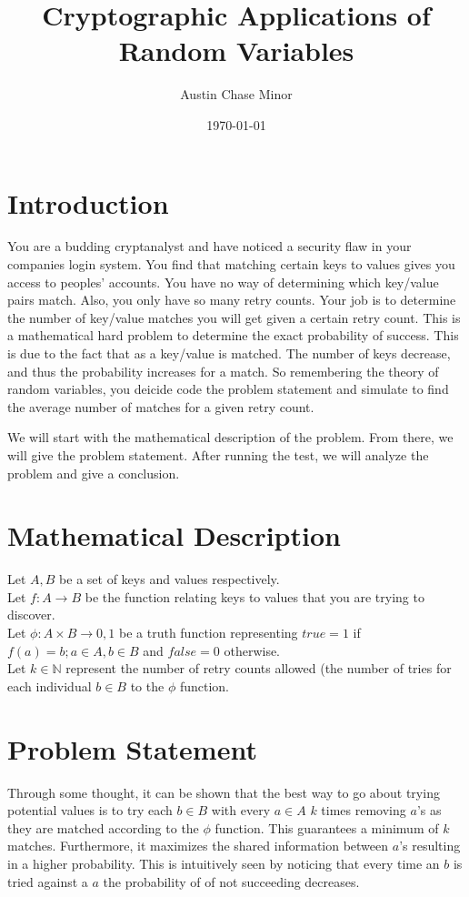 \documentclass{article}
\author{Austin Chase Minor}
\title{Cryptographic Applications of Random Variables}
\date{\today}
\begin{document}
   \maketitle

   \section{Introduction}
   You are a budding cryptanalyst and have noticed a security
   flaw in your companies login system. You find that matching
   certain keys to values gives you access to peoples' accounts.
   You have no way of determining which key/value pairs match.
   Also, you only have so many retry counts. 
   Your job is to determine the number of key/value matches you
   will get given a certain retry count. This is a mathematical
   hard problem to determine the exact probability of success. This
   is due to the fact that
   as a key/value is matched. The number of keys decrease, and thus
   the probability increases for a match. So remembering the theory
   of random variables, you deicide code the problem statement and simulate
   to find the average number of matches for a given retry count.

   We will start with the mathematical description of the problem.
   From there, we will give the problem statement. After running the
   test, we will analyze the problem and give a conclusion.

   \section{Mathematical Description}
   \begin{flushleft}
      Let $A, B$ be a set of keys and values respectively.\\
      Let $f: A \to B$ be the function relating
      keys to values that you are trying to discover.\\
      Let $\phi: A \times B \to {0,1}$ be a truth
      function representing $true = 1$ if $f(a) = b; a \in A, b \in B$
      and $false = 0$ otherwise.\\
      Let $k \in \mathbb{N}$ represent the
      number of retry counts allowed (the number of tries for each individual
      $b \in B$ to the $\phi$ function.\\
   \end{flushleft}

   \section{Problem Statement}
      Through some thought, it can be shown that the best way to go
      about trying potential values is to try each $b \in B$ with
      every $a \in A$ $k$ times removing $a$'s as they are matched
      according to the $\phi$ function. This
      guarantees a minimum of $k$ matches. Furthermore, it maximizes the
      shared information between $a$'s resulting in a higher probability.
      This is intuitively seen by noticing that every time an $b$ is tried
      against a $a$ the probability of of not succeeding decreases.
\end{document}
